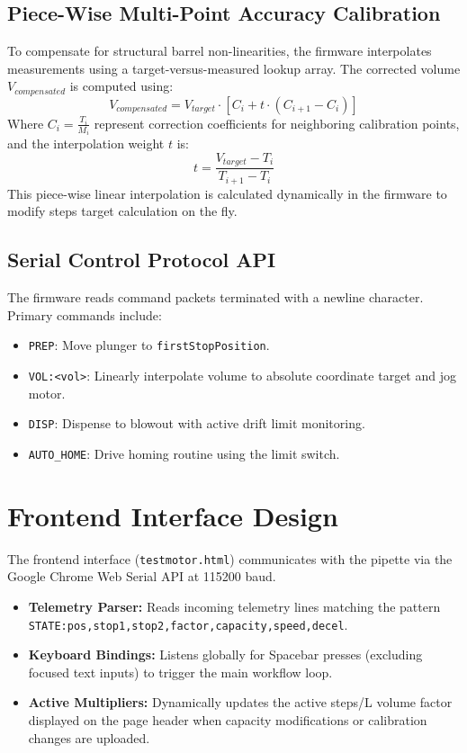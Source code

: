 \documentclass[11pt,a4paper]{article}
\begin{document}
\subsection{Piece-Wise Multi-Point Accuracy Calibration}
To compensate for structural barrel non-linearities, the firmware interpolates measurements using a target-versus-measured lookup array. The corrected volume $V_{compensated}$ is computed using:
\begin{equation}
    V_{compensated} = V_{target} \cdot \left[ C_i + t \cdot (C_{i+1} - C_i) \right]
\end{equation}
Where $C_i = \frac{T_i}{M_i}$ represent correction coefficients for neighboring calibration points, and the interpolation weight $t$ is:
\begin{equation}
    t = \frac{V_{target} - T_i}{T_{i+1} - T_i}
\end{equation}
This piece-wise linear interpolation is calculated dynamically in the firmware to modify steps target calculation on the fly.

\subsection{Serial Control Protocol API}
The firmware reads command packets terminated with a newline character. Primary commands include:
\begin{itemize}
    \item \texttt{PREP}: Move plunger to \texttt{firstStopPosition}.
    \item \texttt{VOL:<vol>}: Linearly interpolate volume to absolute coordinate target and jog motor.
    \item \texttt{DISP}: Dispense to blowout with active drift limit monitoring.
    \item \texttt{AUTO\_HOME}: Drive homing routine using the limit switch.
\end{itemize}

\section{Frontend Interface Design}
The frontend interface (\texttt{testmotor.html}) communicates with the pipette via the Google Chrome Web Serial API at 115200 baud.
\begin{itemize}
    \item \textbf{Telemetry Parser:} Reads incoming telemetry lines matching the pattern \texttt{STATE:pos,stop1,stop2,factor,capacity,speed,decel}.
    \item \textbf{Keyboard Bindings:} Listens globally for Spacebar presses (excluding focused text inputs) to trigger the main workflow loop.
    \item \textbf{Active Multipliers:} Dynamically updates the active steps/\textmu L volume factor displayed on the page header when capacity modifications or calibration changes are uploaded.
\end{itemize}
\end{document}
